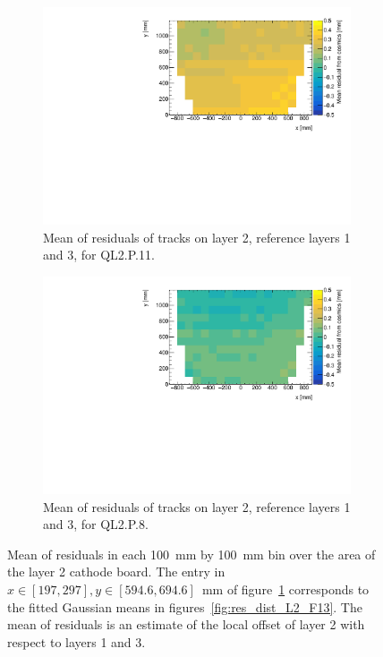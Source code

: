 \newpage
\thispagestyle{empty}
\begin{figure}
\centering
\begin{subfigure}{\textwidth}
  \centering
  \includegraphics[width=\linewidth]{figures/figure_QL2P11_3100V_2021-08-05_th2_means_layer2_fixedlayers13.pdf}
  \caption{Mean of residuals of tracks on layer 2, reference layers 1 and 3, for QL2.P.11.}
  \label{fig:res_mean_th2_ql2p11}
\end{subfigure}%
\vspace*{\floatsep}
\begin{subfigure}{\textwidth}
  \centering
  \includegraphics[width=\linewidth]{figures/figure_QL2P08_3100V_2021-08-03_th2_means_layer2_fixedlayers13.pdf}
  \caption{Mean of residuals of tracks on layer 2, reference layers 1 and 3, for QL2.P.8.}
  \label{fig:res_mean_th2_ql2p8}
\end{subfigure}
\caption{Mean of residuals in each \SI{100}{\milli\meter} by \SI{100}{\milli\meter} bin over the area of the layer 2 cathode board. The entry in $x\in\left[197, 297\right],  y\in\left[594.6, 694.6\right]$~mm of figure~\ref{fig:res_mean_th2_ql2p11} corresponds to the fitted Gaussian means in figures~\ref{fig:res_dist_L2_F13}. The mean of residuals is an estimate of the local offset of layer 2 with respect to layers 1 and 3.}
\label{fig:res_mean_th2}
\end{figure}
\newpage
\restoregeometry

